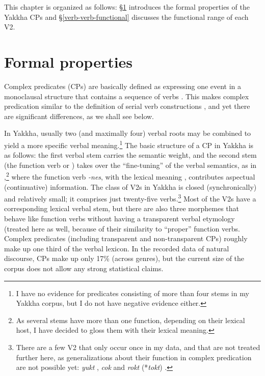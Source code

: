 This chapter is organized as follows:  §\ref{verb-verb-formal} introduces the formal properties of the Yakkha CPs and §\ref{verb-verb-functional} discusses the functional range of each V2.

\section{Formal properties}\label{verb-verb-formal}
 
Complex predicates (CPs) are basically defined as expressing one event in a monoclausal structure that contains a sequence of verbs \citep{Givon1991Some-substantive}. This makes complex predication similar to the definition of serial verb constructions \citep{Aikhenvald2006_Serial, Durie1997_Grammatical}, and yet there are significant differences, as we shall see below. 
 
In Yakkha, usually two (and maximally four) verbal roots may be combined to yield a more specific verbal meaning.\footnote{I have no evidence for predicates consisting of more than four stems in my Yakkha corpus, but I do not have negative evidence either.} The basic structure of a CP in Yakkha is as follows: the first verbal stem carries the semantic weight, and the second stem (the function verb or ) takes over the “fine-tuning” of the verbal semantics,  as in \Next,\footnote{As several stems have more than one function, depending on their lexical host, I have decided to gloss them with their lexical meaning.} where the function verb \emph{-nes}, with the lexical meaning , contributes aspectual (continuative) information. The class of V2s in Yakkha is closed (synchronically) and relatively small; it comprises just twenty-five verbs.\footnote{There are a few V2 that only occur once in my data, and that are not treated further here, as generalizations about their function in complex predication are not possible yet: \emph{yukt} , \emph{cok}  and \emph{rokt} (*\emph{tokt}) .} Most of the V2s have a corresponding lexical verbal stem, but there are also three morphemes that behave like function verbs without having a transparent verbal etymology (treated here as well, because of their similarity to “proper” function verbs. Complex predicates (including transparent and non-transparent CPs) roughly make up one third of the verbal lexicon. In the recorded  data of natural discourse, CPs make up only 17\% (across genres), but the current size of the corpus does not allow any strong statistical claims.



